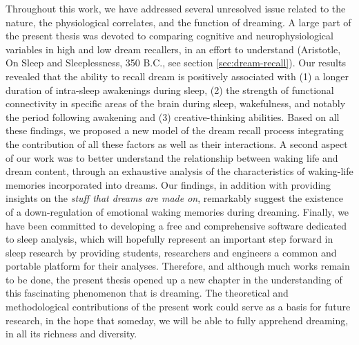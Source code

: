 Throughout this work, we have addressed several unresolved issue related to the nature, the physiological correlates, and the function of dreaming. A large part of the present thesis was devoted to comparing cognitive and neurophysiological variables in high and low dream recallers, in an effort to understand  (Aristotle, On Sleep and Sleeplessness, 350 B.C., see section \ref{sec:dream-recall}). Our results revealed that the ability to recall dream is positively associated with (1) a longer duration of intra-sleep awakenings during sleep, (2) the strength of functional connectivity in specific areas of the brain during sleep, wakefulness, and notably the period following awakening and (3) creative-thinking abilities. Based on all these findings, we proposed a new model of the dream recall process integrating the contribution of all these factors as well as their interactions. A second aspect of our work was to better understand the relationship between waking life and dream content, through an exhaustive analysis of the characteristics of waking-life memories incorporated into dreams. Our findings, in addition with providing insights on the \emph{stuff that dreams are made on}, remarkably suggest the existence of a down-regulation of emotional waking memories during dreaming. Finally, we have been committed to developing a free and comprehensive software dedicated to sleep analysis, which will hopefully represent an important step forward in sleep research by providing students, researchers and engineers a common and portable platform for their analyses. Therefore, and although much works remain to be done, the present thesis opened up a new chapter in the understanding of this fascinating phenomenon that is dreaming. The theoretical and methodological contributions of the present work could serve as a basis for future research, in the hope that someday, we will be able to fully apprehend dreaming, in all its richness and diversity.
